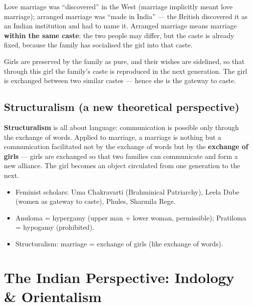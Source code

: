 \begin{ExampleBox}
Love marriage was ``discovered'' in the West (marriage implicitly meant love marriage); arranged marriage was ``made in India'' --- the British discovered it as an Indian institution and had to name it. Arranged marriage means marriage \textbf{within the same caste}: the two people may differ, but the caste is already fixed, because the family has socialised the girl into that caste.
\end{ExampleBox}

Girls are preserved by the family as pure, and their wishes are sidelined, so that through this girl the family's caste is reproduced in the next generation. The girl is exchanged between two similar castes --- hence she is the gateway to caste.

\subsection{Structuralism (a new theoretical perspective)}

\begin{KeyConcept}
\textbf{Structuralism} is all about language: communication is possible only through the exchange of words. Applied to marriage, a marriage is nothing but a communication facilitated not by the exchange of words but by the \textbf{exchange of girls} --- girls are exchanged so that two families can communicate and form a new alliance. The girl becomes an object circulated from one generation to the next.
\end{KeyConcept}

\begin{QuickRevision}
\begin{itemize}
\item Feminist scholars: Uma Chakravarti (Brahminical Patriarchy), Leela Dube (women as gateway to caste), Phules, Sharmila Rege.
\item Anuloma = hypergamy (upper man + lower woman, permissible); Pratiloma = hypogamy (prohibited).
\item Structuralism: marriage = exchange of girls (like exchange of words).
\end{itemize}
\end{QuickRevision}

\section{The Indian Perspective: Indology \& Orientalism}

